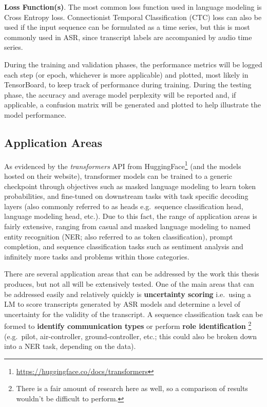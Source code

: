 \documentclass[10pt]{article}
\begin{document}
        \textbf{Loss Function(s)}.
        The most common loss function used in language modeling is Cross Entropy loss. Connectionist Temporal Classification (CTC) loss
        can also be used if the input sequence can be formulated as a time series, but this is most commonly used in ASR, since
        transcript labels are accompanied by audio time series.


        During the training and validation phases, the performance metrics will be logged each step (or epoch, whichever is more
        applicable) and plotted, most likely in TensorBoard, to keep track of performance during training. During the testing phase,
        the accuracy and average model perplexity will be reported and, if applicable, a confusion matrix will be generated and plotted
        to help illustrate the model performance.


        \subsection{Application Areas}
        As evidenced by the \textit{transformers} API from HuggingFace\footnote{\url{https://huggingface.co/docs/transformers}} (and the models hosted
        on their website), transformer models can be trained to a generic checkpoint through objectives such as masked language modeling to learn
        token probabilities, and fine-tuned on downstream tasks with task specific decoding layers (also commonly referred to as heads
        e.g.~sequence classification head, language modeling head, etc.). Due to this fact, the range of application areas is fairly
        extensive, ranging from casual and masked language modeling to named entity recognition (NER; also referred to as token
        classification), prompt completion, and sequence classification tasks such as sentiment analysis and infinitely more tasks and
        problems within those categories.


        There are several application areas that can be addressed by the work this thesis produces, but not all will be extensively
        tested. One of the main areas that can be addressed easily and relatively quickly is \textbf{uncertainty scoring} i.e.~using a
        LM to score transcripts generated by ASR models and determine a level of uncertainty for the validity of the transcript.
        A sequence classification task can be formed to \textbf{identify communication types} or perform \textbf{role identification}
        \footnote{There is a fair amount of research here as well, so a comparison of results wouldn't be difficult to perform.}
        (e.g.~pilot, air-controller, ground-controller, etc.; this could also be broken down into a NER task, depending on the data).
\end{document}
